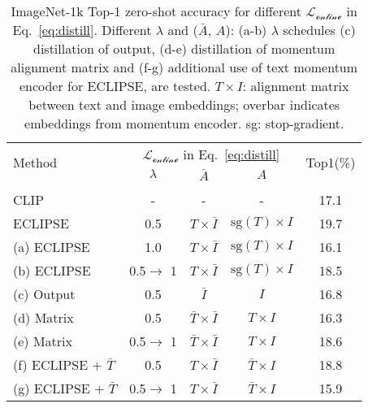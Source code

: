 \begin{table}[t!]
  \tabcolsep=0.17cm %
  \centering
  \small
  \begin{tabular}{l | c c c c}
    \toprule
    \multirow{2}{*}{Method} & \multicolumn{3}{c}{$\mathcal{L_{\text{online}}}$ in Eq.~\ref{eq:distill}} & \multirow{2}{*}{Top1(\%)} \\
     & $\lambda$ & $\bar{A}$ & $A$ &  \\ \hline \\[-9pt]
    CLIP & - & - & - & 17.1 \\
    ECLIPSE & 0.5 & $T\times \bar{I}$ & $\text{sg}(T)\times I$ & 19.7 \\
    \midrule
    (a) ECLIPSE & 1.0 & $T\times \bar{I}$ & $\text{sg}(T)\times I$ & 16.1 \\
    (b) ECLIPSE & 0.5$\rightarrow$ 1 & $T\times \bar{I}$ & $\text{sg}(T)\times I$ & 18.5 \\
    \midrule
    (c) Output & 0.5 & $\bar{I}$ & $I$ & 16.8 \\
    (d) Matrix & 0.5 & $\bar{T}\times \bar{I}$ & $T\times I$ & 16.3 \\
    (e) Matrix & 0.5$\rightarrow$ 1 & $\bar{T}\times \bar{I}$ & $T\times I$ & 18.6 \\
    (f) ECLIPSE + $\bar{T}$ & 0.5 & $T\times \bar{I}$ & $\bar{T}\times I$ & 18.8 \\
    (g) ECLIPSE + $\bar{T}$ & 0.5$\rightarrow$ 1 & $T\times \bar{I}$ & $\bar{T}\times I$ & 15.9 \\
    \bottomrule
  \end{tabular}
  \vspace{0.5em}
  \caption{ImageNet-1k Top-1 zero-shot accuracy for different $\mathcal{L_{\text{online}}}$ in Eq.~\ref{eq:distill}. Different $\lambda$ and ($\bar{A}$, $A$): (a-b) $\lambda$ schedules (c) distillation of output, (d-e) distillation of momentum alignment matrix and (f-g) additional use of text momentum encoder for ECLIPSE, are tested. $T\times I$: alignment matrix between text and image embeddings; overbar indicates embeddings from momentum encoder. sg: stop-gradient.}
  \label{tab:distill}
\end{table}
